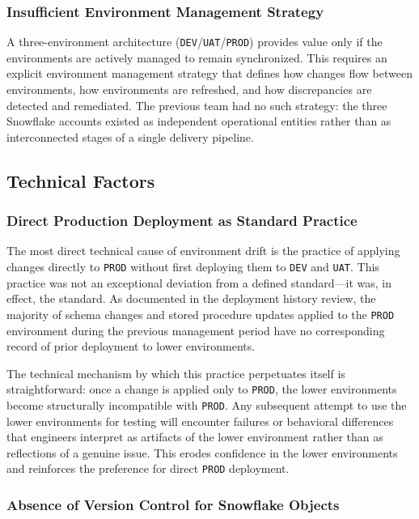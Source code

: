 \subsubsection{Insufficient Environment Management Strategy}

A three-environment architecture (\texttt{DEV}/\texttt{UAT}/\texttt{PROD}) provides value only if the environments are actively managed to remain synchronized. This requires an explicit environment management strategy that defines how changes flow between environments, how environments are refreshed, and how discrepancies are detected and remediated. The previous team had no such strategy: the three Snowflake accounts existed as independent operational entities rather than as interconnected stages of a single delivery pipeline.

\subsection{Technical Factors}
\label{subsec:tech-factors}

\subsubsection{Direct Production Deployment as Standard Practice}

The most direct technical cause of environment drift is the practice of applying changes directly to \texttt{PROD} without first deploying them to \texttt{DEV} and \texttt{UAT}. This practice was not an exceptional deviation from a defined standard---it was, in effect, the standard. As documented in the deployment history review, the majority of schema changes and stored procedure updates applied to the \texttt{PROD} environment during the previous management period have no corresponding record of prior deployment to lower environments.

The technical mechanism by which this practice perpetuates itself is straightforward: once a change is applied only to \texttt{PROD}, the lower environments become structurally incompatible with \texttt{PROD}. Any subsequent attempt to use the lower environments for testing will encounter failures or behavioral differences that engineers interpret as artifacts of the lower environment rather than as reflections of a genuine issue. This erodes confidence in the lower environments and reinforces the preference for direct \texttt{PROD} deployment.

\subsubsection{Absence of Version Control for Snowflake Objects}

